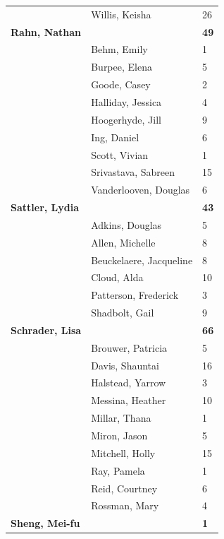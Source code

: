 \documentclass{article}\usepackage[]{graphicx}\usepackage[]{color}
\begin{document}
{\begin{longtable} { >{\raggedright}p{}|p{}p{}}
   & Willis, Keisha & 26 \\ 
  \textbf{Rahn, Nathan} &  & \hspace{2cm}\textbf{49} \\ 
   & Behm, Emily & 1 \\ 
   \rowcolor[gray]{0.90} & Burpee, Elena & 5 \\ 
   \rowcolor[gray]{0.90} & Goode, Casey & 2 \\ 
   \rowcolor[gray]{0.90} & Halliday, Jessica & 4 \\ 
   & Hoogerhyde, Jill & 9 \\ 
   & Ing, Daniel & 6 \\ 
   & Scott, Vivian & 1 \\ 
   \rowcolor[gray]{0.90} & Srivastava, Sabreen & 15 \\ 
   \rowcolor[gray]{0.90} & Vanderlooven, Douglas & 6 \\ 
   \rowcolor[gray]{0.90}\textbf{Sattler, Lydia} &  & \hspace{2cm}\textbf{43} \\ 
   & Adkins, Douglas & 5 \\ 
   & Allen, Michelle & 8 \\ 
   & Beuckelaere, Jacqueline & 8 \\ 
   \rowcolor[gray]{0.90} & Cloud, Alda & 10 \\ 
   \rowcolor[gray]{0.90} & Patterson, Frederick & 3 \\ 
   \rowcolor[gray]{0.90} & Shadbolt, Gail & 9 \\ 
  \textbf{Schrader, Lisa} &  & \hspace{2cm}\textbf{66} \\ 
   & Brouwer, Patricia & 5 \\ 
   & Davis, Shauntai & 16 \\ 
   \rowcolor[gray]{0.90} & Halstead, Yarrow & 3 \\ 
   \rowcolor[gray]{0.90} & Messina, Heather & 10 \\ 
   \rowcolor[gray]{0.90} & Millar, Thana & 1 \\ 
   & Miron, Jason & 5 \\ 
   & Mitchell, Holly & 15 \\ 
   & Ray, Pamela & 1 \\ 
   \rowcolor[gray]{0.90} & Reid, Courtney & 6 \\ 
   \rowcolor[gray]{0.90} & Rossman, Mary & 4 \\ 
   \rowcolor[gray]{0.90}\textbf{Sheng, Mei-fu} &  & \hspace{2cm}\textbf{1} \\ 

\end{longtable}}
\end{document}
